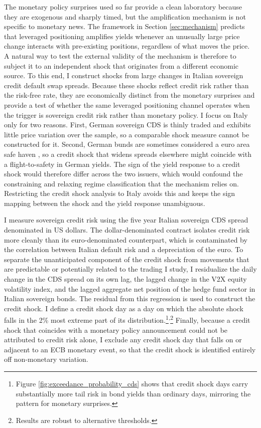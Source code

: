 \documentclass[english, 11pt, oneside]{article}
\begin{document}
The monetary policy surprises used so far provide a clean laboratory because they are exogenous and sharply timed, but the amplification mechanism is not specific to monetary news. The framework in Section \ref{sec:mechanism} predicts that leveraged positioning amplifies yields whenever an unusually large price change interacts with pre-existing positions, regardless of what moves the price. A natural way to test the external validity of the mechanism is therefore to subject it to an independent shock that originates from a different economic source. To this end, I construct shocks from large changes in Italian sovereign credit default swap spreads. Because these shocks reflect credit risk rather than the risk-free rate, they are economically distinct from the monetary surprises and provide a test of whether the same leveraged positioning channel operates when the trigger is sovereign credit risk rather than monetary policy. I focus on Italy only for two reasons. First, German sovereign CDS is thinly traded and exhibits little price variation over the sample, so a comparable shock measure cannot be constructed for it. Second, German bunds are sometimes considered a euro area safe haven \citep[e.g.,][]{ehrmann2017}, so a credit shock that widens spreads elsewhere might coincide with a flight-to-safety in German yields. The sign of the yield response to a credit shock would therefore differ across the two issuers, which would confound the constraining and relaxing regime classification that the mechanism relies on. Restricting the credit shock analysis to Italy avoids this and keeps the sign mapping between the shock and the yield response unambiguous.

I measure sovereign credit risk using the five year Italian sovereign CDS spread denominated in US dollars. The dollar-denominated contract isolates credit risk more cleanly than its euro-denominated counterpart, which is contaminated by the correlation between Italian default risk and a depreciation of the euro. To separate the unanticipated component of the credit shock from movements that are predictable or potentially related to the trading I study, I residualize the daily change in the CDS spread on its own lag, the lagged change in the V2X equity volatility index, and the lagged aggregate net position of the hedge fund sector in Italian sovereign bonds. The residual from this regression is used to construct the credit shock. I define a credit shock day as a day on which the absolute shock falls in the 2\% most extreme part of its distribution.\footnote{Figure \ref{fig:exceedance_probability_cds} shows that credit shock days carry substantially more tail risk in bond yields than ordinary days, mirroring the pattern for monetary surprises.}\textsuperscript{,}\footnote{Results are robust to alternative thresholds.} Finally, because a credit shock that coincides with a monetary policy announcement could not be attributed to credit risk alone, I exclude any credit shock day that falls on or adjacent to an ECB monetary event, so that the credit shock is identified entirely off non-monetary variation.
\end{document}
